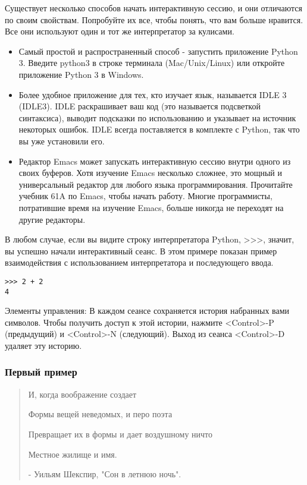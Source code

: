Существует несколько способов начать интерактивную сессию, и они отличаются по своим свойствам. Попробуйте их все, чтобы понять, что вам больше нравится. Все они используют один и тот же интерпретатор за кулисами.
\begin{itemize}
  \item Самый простой и распространенный способ - запустить приложение Python 3. Введите python3 в строке терминала (Mac/Unix/Linux) или откройте приложение Python 3 в Windows.
  \item Более удобное приложение для тех, кто изучает язык, называется IDLE 3 (IDLE3). IDLE раскрашивает ваш код (это называется подсветкой синтаксиса), выводит подсказки по использованию и указывает на источник некоторых ошибок. IDLE всегда поставляется в комплекте с Python, так что вы уже установили его.
  \item Редактор Emacs может запускать интерактивную сессию внутри одного из своих буферов. Хотя изучение Emacs несколько сложнее, это мощный и универсальный редактор для любого языка программирования. Прочитайте учебник 61A по Emacs, чтобы начать работу. Многие программисты, потратившие время на изучение Emacs, больше никогда не переходят на другие редакторы.
\end{itemize}

В любом случае, если вы видите строку интерпретатора Python, >>>, значит, вы успешно начали интерактивный сеанс. В этом примере показан пример взаимодействия с использованием интерпретатора и последующего ввода.

\begin{lstlisting}
>>> 2 + 2
4
\end{lstlisting}

Элементы управления: В каждом сеансе сохраняется история набранных вами символов. Чтобы получить доступ к этой истории, нажмите <Control>-P (предыдущий) и <Control>-N (следующий). Выход из сеанса <Control>-D удаляет эту историю.

\subsubsection{Первый пример}
\begin{quotation}
И, когда воображение создает

Формы вещей неведомых, и перо поэта

Превращает их в формы и дает воздушному ничто

Местное жилище и имя.

- Уильям Шекспир, "Сон в летнюю ночь".
\end{quotation}

